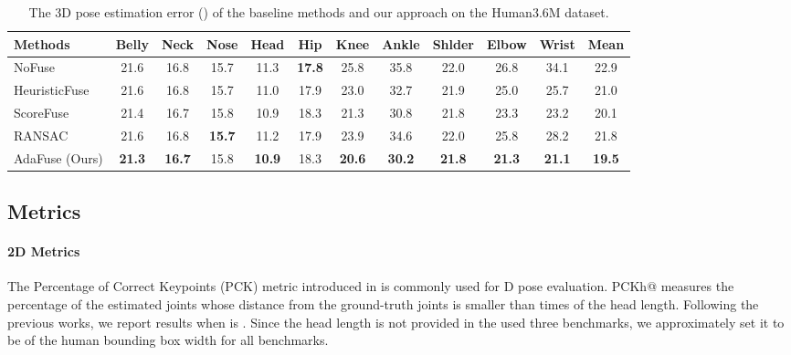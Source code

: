 \begin{table*}[ht]
\centering
\caption{The 3D pose estimation error () of the baseline methods and our approach on the Human3.6M dataset. }
\label{table:ablation_h36m_mpjpe}
\begin{tabular}{l|cccccccccc|c}
\toprule
Methods      & Belly & Neck & Nose & Head & Hip  & Knee & Ankle  & Shlder  & Elbow  & Wrist  & Mean \\ \hline
NoFuse        & 21.6  & 16.8 & 15.7 & 11.3 & \textbf{17.8}     & 25.8     & 35.8     & 22.0     & 26.8     & 34.1     & 22.9  \\
HeuristicFuse      & 21.6  & 16.8 & 15.7 & 11.0 & 17.9     & 23.0     & 32.7     & 21.9     & 25.0     & 25.7     & 21.0  \\
ScoreFuse           & 21.4  & 16.7 & 15.8 & 10.9 & 18.3     & 21.3     & 30.8     & 21.8     & 23.3     & 23.2     & 20.1  \\
RANSAC         & 21.6  & 16.8 & \textbf{15.7} & 11.2 & 17.9     & 23.9     & 34.6     & 22.0     & 25.8     & 28.2     & 21.8  \\
AdaFuse (Ours)     & {\textbf{21.3}}  & \textbf{16.7} & 15.8 & \textbf{10.9} & 18.3     & \textbf{20.6}     & \textbf{30.2}     & \textbf{21.8}     & \textbf{21.3}     & \textbf{21.1}     & \textbf{19.5}  \\
\toprule
\end{tabular}
\end{table*}







\subsection{Metrics}

\paragraph{2D Metrics} The Percentage of Correct Keypoints (PCK) metric introduced in \cite{andriluka14cvpr} is commonly used for D pose evaluation. PCKh@ measures the percentage of the estimated joints whose distance from the ground-truth joints is smaller than  times of the head length. Following the previous works, we report results when  is . Since the head length is not provided in the used three benchmarks, we approximately set it to be  of the human bounding box width for all benchmarks.



